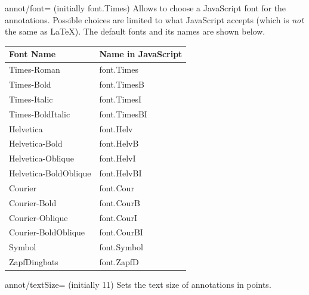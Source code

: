 \begin{pgfplotskey}{annot/font= (initially font.Times)}
    Allows to choose a JavaScript font for the annotations. Possible choices
    are limited to what JavaScript accepts (which is \emph{not} the same as
    \LaTeX{}). The default fonts and its names are shown below.

    \begin{center}
        \begin{tabular}{ll}
                \toprule
            Font Name             & Name in JavaScript \\
                \midrule
            Times-Roman           & font.Times         \\
            Times-Bold            & font.TimesB        \\
            Times-Italic          & font.TimesI        \\
            Times-BoldItalic      & font.TimesBI       \\
            Helvetica             & font.Helv          \\
            Helvetica-Bold        & font.HelvB         \\
            Helvetica-Oblique     & font.HelvI         \\
            Helvetica-BoldOblique & font.HelvBI        \\
            Courier               & font.Cour          \\
            Courier-Bold          & font.CourB         \\
            Courier-Oblique       & font.CourI         \\
            Courier-BoldOblique   & font.CourBI        \\
            Symbol                & font.Symbol        \\
            ZapfDingbats          & font.ZapfD         \\
                \bottomrule
        \end{tabular}
    \end{center}
\end{pgfplotskey}

\begin{pgfplotskey}{annot/textSize= (initially 11)}
    Sets the text size of annotations in points.
\end{pgfplotskey}

